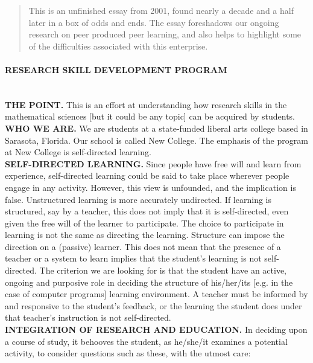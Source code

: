 
\begin{quote}
This is an unfinished essay from 2001, found nearly a decade and a
half later in a box of odds and ends. The essay foreshadows our
ongoing research on peer produced peer learning, and also helps to
highlight some of the difficulties associated with this enterprise.
\end{quote}

\paragraph{RESEARCH SKILL DEVELOPMENT PROGRAM}\quad\\

\noindent \textbf{THE POINT.} This is an effort at understanding how
research skills in the mathematical sciences [but it could be any
topic] can be acquired by students. \\

\noindent \textbf{WHO WE ARE.} We are students at a state-funded liberal
arts college based in Sarasota, Florida.  Our school is called New
College.  The emphasis of the program at New College is self-directed
learning. \\

\noindent \textbf{SELF-DIRECTED LEARNING.} Since people have free will and
learn from experience, self-directed learning could be said to take
place wherever people engage in any activity.  However, this view is
unfounded, and the implication is false.  Unstructured learning is
more accurately undirected.  If learning is structured, say by a
teacher, this does not imply that it is self-directed, even given the
free will of the learner to participate.  The choice to participate in
learning is not the same as directing the learning.  Structure can
impose the direction on a (passive) learner.  This does not mean that
the presence of a teacher or a system to learn implies that the
student's learning is not self-directed.  The criterion we are looking
for is that the student have an active, ongoing and purposive role in
deciding the structure of his/her/its [e.g. in the case of computer
programs] learning environment.  A teacher must be informed by and
responsive to the student's feedback, or the learning the student does
under that teacher's instruction is not self-directed. \\

\noindent \textbf{INTEGRATION OF RESEARCH AND EDUCATION.} In deciding upon
a course of study, it behooves the student, as he/she/it examines a
potential activity, to consider questions such as these, with the
utmost care:

